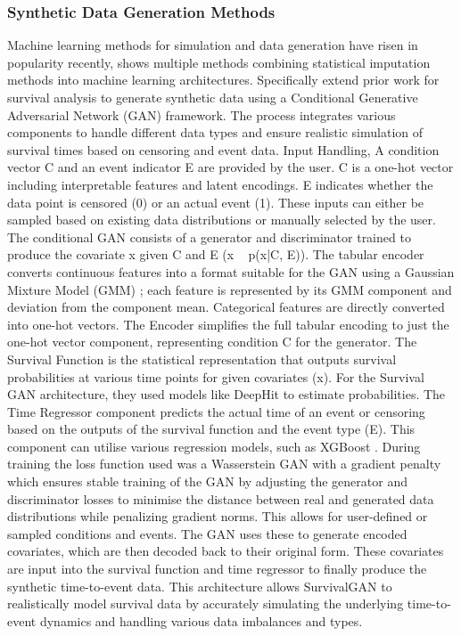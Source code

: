 \subsubsection{Synthetic Data Generation Methods}
Machine learning methods for simulation and data generation have risen in popularity recently, \parencite{norcliffe_survivalgan_2023} shows multiple methods combining statistical imputation methods into machine learning architectures. Specifically \parencite{norcliffe_survivalgan_2023} extend prior work for survival analysis to generate synthetic data using a Conditional Generative Adversarial Network (GAN) framework. The process integrates various components to handle different data types and ensure realistic simulation of survival times based on censoring and event data. Input Handling, A condition vector C and an event indicator E are provided by the user. C is a one-hot vector including interpretable features and latent encodings. E indicates whether the data point is censored (0) or an actual event (1). These inputs can either be sampled based on existing data distributions or manually selected by the user. The conditional GAN consists of a generator and discriminator trained to produce the covariate x given C and E (x ~ p(x|C, E)). The tabular encoder converts continuous features into a format suitable for the GAN using a Gaussian Mixture Model (GMM) \parencite{norcliffe_survivalgan_2023}; each feature is represented by its GMM component and deviation from the component mean. Categorical features are directly converted into one-hot vectors. The Encoder simplifies the full tabular encoding to just the one-hot vector component, representing condition C for the generator. The Survival Function is the statistical representation that outputs survival probabilities at various time points for given covariates (x). For the Survival GAN architecture, they used models like DeepHit \parencite{norcliffe_survivalgan_2023} to estimate probabilities. The Time Regressor component predicts the actual time of an event or censoring based on the outputs of the survival function and the event type (E). This component can utilise various regression models, such as XGBoost \parencite{norcliffe_survivalgan_2023}. During training the loss function used was a Wasserstein GAN \parencite{norcliffe_survivalgan_2023} with a gradient penalty which ensures stable training of the GAN by adjusting the generator and discriminator losses to minimise the distance between real and generated data distributions while penalizing gradient norms. This allows for user-defined or sampled conditions and events. The GAN uses these to generate encoded covariates, which are then decoded back to their original form. These covariates are input into the survival function and time regressor to finally produce the synthetic time-to-event data. This architecture allows SurvivalGAN to realistically model survival data by accurately simulating the underlying time-to-event dynamics and handling various data imbalances and types.

